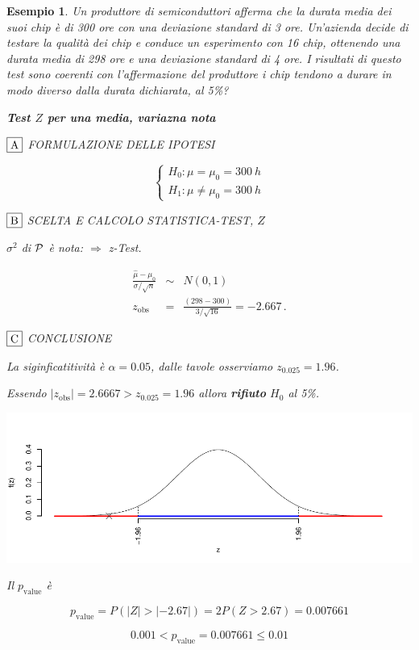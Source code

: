 \documentclass[
  11pt,
]{book}
\theoremstyle{mytheoremstyle}
\theoremstyle{mydefstyle}
\newtheorem{example}{{Esempio}}[section]
\begin{document}
\begin{example}
Un produttore di semiconduttori afferma che la durata media dei suoi chip è di 300 ore con una deviazione standard di 3 ore. Un'azienda decide di testare la qualità dei chip e conduce un esperimento con 16 chip, ottenendo una durata media di 298 ore e una deviazione standard di 4 ore. I risultati di questo test sono coerenti con l'affermazione del produttore i chip tendono a durare in modo diverso dalla durata dichiarata, al 5\%?

\textbf{Test \(Z\) per una media, variazna nota}

\(\fbox{A}\) FORMULAZIONE DELLE IPOTESI

\[\begin{cases}
   H_0: \mu = \mu_0=300~h \\
   H_1: \mu \neq \mu_0=300~h 
   \end{cases}\]

\(\fbox{B}\) SCELTA E CALCOLO STATISTICA-TEST, \(Z\)

\(\sigma^{2}\) di \(\cal{P}\) è nota: \(\Rightarrow\) z-Test.

\begin{eqnarray*}
   \frac{\hat\mu - \mu_{0}} {\sigma/\sqrt{n}}&\sim&N(0,1)\\
   z_{\text{obs}}
   &=& \frac{ ( 298 -  300 )} { 3 /\sqrt{ 16 }}
   =   -2.667 \, .
   \end{eqnarray*}

\(\fbox{C}\) CONCLUSIONE

La siginficatitività è \(\alpha=0.05\), dalle tavole osserviamo \(z_{0.025}=1.96\).

Essendo \(|z_\text{obs}|=2.6667>z_{0.025}=1.96\) allora \textbf{rifiuto} \(H_0\) al 5\%.

\begin{center}\includegraphics{Appunti_di_Statistica_2025_files/figure-latex/15-test-mu-pi-4-1} \end{center}

Il \(p_{\text{value}}\) è

\[ p_{\text{value}} = P(|Z|>|-2.67|)=2P(Z>2.67)=0.007661 \]

\[
 0.001 < p_\text{value}= 0.007661 \leq 0.01 
\]
\end{example}
\end{document}
